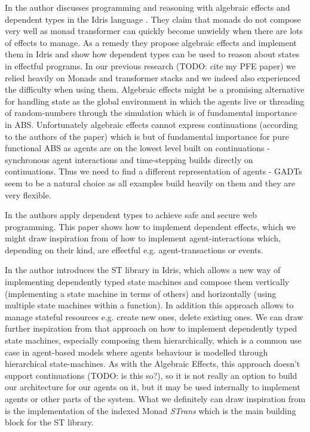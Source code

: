 In \cite{brady_programming_2013} the author discusses programming and reasoning with algebraic effects and dependent types in the Idris language \cite{brady_idris_2013}. They claim that monads do not compose very well as monad transformer can quickly become unwieldy when there are lots of effects to manage. As a remedy they propose algebraic effects and implement them in Idris and show how dependent types can be used to reason about states in effectful programs. In our previous research (TODO: cite my PFE paper) we relied heavily on Monads and transformer stacks and we indeed also experienced the difficulty when using them. Algebraic effects might be a promising alternative for handling state as the global environment in which the agents live or threading of random-numbers through the simulation which is of fundamental importance in ABS. Unfortunately algebraic effects cannot express continuations (according to the authors of the paper) which is but of fundamental importance for pure functional ABS as agents are on the lowest level built on continuations - synchronous agent interactions and time-stepping builds directly on continuations. Thus we need to find a different representation of agents - GADTs seem to be a natural choice as all examples build heavily on them and they are very flexible.

In \cite{fowler_dependent_2014} the authors apply dependent types to achieve safe and secure web programming. This paper shows how to implement dependent effects, which we might draw inspiration from of how to implement agent-interactions which, depending on their kind, are effectful e.g. agent-transactions or events.

In \cite{brady_state_2016} the author introduces the ST library in Idris, which allows a new way of implementing dependently typed state machines and compose them vertically (implementing a state machine in terms of others) and horizontally (using multiple state machines within a function). In addition this approach allows to manage stateful resources e.g. create new ones, delete existing ones. We can draw further inspiration from that approach on how to implement dependently typed state machines, especially composing them hierarchically, which is a common use case in agent-based models where agents behaviour is modelled through hierarchical state-machines. As with the Algebraic Effects, this approach doesn't support continuations (TODO: is this so?), so it is not really an option to build our architecture for our agents on it, but it may be used internally to implement agents or other parts of the system. What we definitely can draw inspiration from is the implementation of the indexed Monad \textit{STrans} which is the main building block for the ST library.

